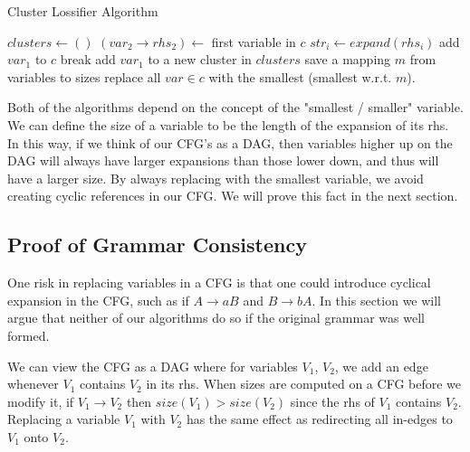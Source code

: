 \documentclass[11pt]{article}
\begin{document}
\begin{algorithm}[h]
\caption{Cluster Lossifier Algorithm}
\label{cluster_alg}
\begin{algorithmic}[1]
 
    \State $clusters \gets ()$
        \State $(var_2 \rightarrow rhs_2) \gets $ first variable in $c$
        \State $str_{i} \gets expand(rhs_i)$
          \State add $var_1$ to $c$
          \State break
        \EndIf
      \EndFor
        \State add $var_1$ to a new cluster in $clusters$
      \EndIf
    \EndFor
    \State save a mapping $m$ from variables to sizes
      \State replace all $var \in c$ with the smallest (smallest w.r.t. $m$).
    \EndFor
  \EndWhile
\EndProcedure
\end{algorithmic}
\end{algorithm}

Both of the algorithms depend on the concept of the "smallest / smaller"
variable. We can define the size of a variable to be the length of the
expansion of its rhs. In this way, if we think of our CFG's as a DAG, then
variables higher up on the DAG will always have larger expansions than those
lower down, and thus will have a larger size. By always replacing with the
smallest variable, we avoid creating cyclic references in our CFG.  We will
prove this fact in the next section.

\subsection{Proof of Grammar Consistency}

One risk in replacing variables in a CFG is that one could introduce cyclical
expansion in the CFG, such as if $A\rightarrow aB$ and $B\rightarrow bA$. In
this section we will argue that neither of our algorithms do so if the original
grammar was well formed.

We can view the CFG as a DAG where for variables $V_1$, $V_2$, we add an edge
whenever $V_1$ contains $V_2$ in its rhs. When sizes are computed on a CFG
before we modify it, if $V_1 \rightarrow V_2$ then $size(V_1) > size(V_2)$
since the rhs of $V_1$ contains $V_2$.  Replacing a variable $V_1$ with $V_2$
has the same effect as redirecting all in-edges to $V_1$ onto $V_2$.
\end{document}
